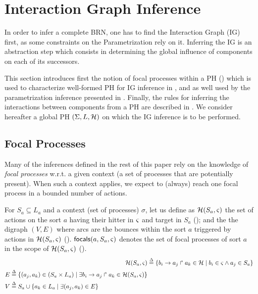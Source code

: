 \section{Interaction Graph Inference}\label{sec:infer-IG}

In order to infer a complete BRN, one has to find the Interaction Graph (IG) first, as some
constraints on the Parametrization rely on it.
Inferring the IG is an abstraction step which consists in determining the global influence of
components on each of its successors.

This section introduces first the notion of focal processes within a PH
() which is used to characterize well-formed PH for IG inference
in , and as well used by the parametrization inference presented in .
Finally, the rules for inferring the interactions between components from a PH are
described in .
We consider hereafter a global PH $(\Sigma,L,\mathcal{H})$ on which the IG inference is to be
performed.

\subsection{Focal Processes}\label{ssec:focal}

Many of the inferences defined in the rest of this paper rely on the knowledge of \emph{focal
processes} w.r.t. a given context (a set of processes that are potentially present).
When such a context applies, we expect to (always) reach one focal process in a bounded number of
actions.

For $S_a\subseteq L_a$ and a context (set of processes) $\sigma$, let us define as $\mathcal{H}(S_a,\varsigma)$
the set of actions on the sort $a$ having their hitter in $\varsigma$ and target in $S_a$
();
and the the digraph $(V, E)$ where arcs are the bounces within the sort $a$ triggered by actions
in $\mathcal{H}(S_a,\varsigma)$ ().
$\mathsf{focals}(a,S_a,\varsigma)$ denotes the set of focal processes of sort $a$ in the scope of
$\mathcal{H}(S_a,\varsigma)$ ().
\begin{align}
\mathcal{H}(S_a,\varsigma) & \stackrel{\Delta}= \{ b_i\rightarrow a_j\Rsh a_k\in\mathcal{H} \mid b_i\in\varsigma \wedge a_j\in S_a \}
\label{eq:PHa-ctx}
\\
\begin{split}
E  & \stackrel{\Delta}= \{(a_j,a_k)\in (S_a \times L_a) \mid 
			\exists b_i\rightarrow a_j\Rsh a_k\in \mathcal{H}(S_a,\varsigma) \}
\\
V & \stackrel{\Delta}= S_a \cup \{ a_k\in L_a\mid \exists (a_j,a_k)\in E\}
\end{split}
\label{eq:bounce-graph}
\end{align}

